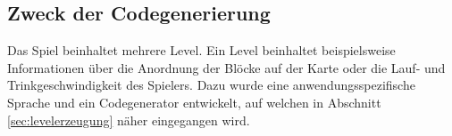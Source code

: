 \subsection{Zweck der Codegenerierung}

Das Spiel beinhaltet mehrere Level.
Ein Level beinhaltet beispielsweise Informationen über die Anordnung der Blöcke auf der Karte oder die Lauf- und Trinkgeschwindigkeit des Spielers.
Dazu wurde eine anwendungsspezifische Sprache und ein Codegenerator entwickelt, auf welchen in Abschnitt \ref{sec:levelerzeugung} näher eingegangen wird.